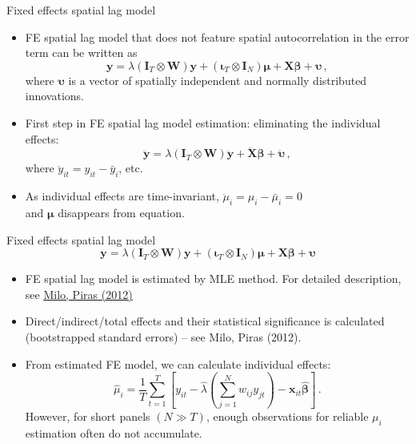 \documentclass{beamer}
\newcommand{\Ms}[2]{\bm{#1}_{#2}}
\begin{document}
\begin{frame}{Fixed effects spatial lag model}
\begin{itemize}
    \item FE spatial lag model that does not feature spatial autocorrelation in the error term can be written as 
\begin{equation*}
  \bm{y}  = 
  \lambda \left( \Ms{I}{T} \otimes \bm{W} \right) \bm{y} + 
  \left( \Ms{\iota}{T} \otimes \Ms{I}{N} \right) \bm{\mu} + 
  \bm{X \beta} + \bm{\upsilon} \,,
\end{equation*}
where $\bm{\upsilon}$ is a vector of spatially independent and normally distributed innovations.
\medskip
\item First step in FE spatial lag model estimation: eliminating the individual effects: 
\begin{equation*}
  \ddot{\bm{y}}  = 
  \lambda \left( \Ms{I}{T} \otimes \bm{W} \right) \ddot{\bm{y}} + 
  \ddot{\bm{X}} \bm{\beta} + \ddot{\bm{\upsilon}} \,,
\end{equation*}
where $\ddot{y}_{it}=y_{it}-\bar{y}_i$, etc.
\medskip
\item As individual effects are time-invariant, $\ddot{\mu}_{i}=\mu_{i}-\bar{\mu}_i=0$ \\and $\bm{\mu}$ disappears from equation.
\end{itemize}
\end{frame}
\begin{frame}{Fixed effects spatial lag model}
$$
\bm{y}  = 
  \lambda \left( \Ms{I}{T} \otimes \bm{W} \right) \bm{y} + 
  \left( \Ms{\iota}{T} \otimes \Ms{I}{N} \right) \bm{\mu} + 
  \bm{X \beta} + \bm{\upsilon}
$$
\begin{itemize}
    \item FE spatial lag model is estimated by MLE method. For detailed description, see \textcolor{blue}{\underline{\href{https://www.jstatsoft.org/article/view/v047i01}{Milo, Piras (2012)}}}
    \medskip
    \item Direct/indirect/total effects and their statistical significance is calculated (bootstrapped standard errors) -- see Milo, Piras (2012).
    \medskip
    \item From estimated FE model, we can calculate individual effects:
\begin{equation*}
\hat{\mu}_i =
\frac{1}{T} \sum_{t=1}^T \left[ y_{it} - \hat{\lambda} \left( \sum_{j=1}^N \! w_{ij} y_{jt} \right)
- \bm{x}_{it} \bm{\hat{\beta}} \right] \,.
\end{equation*}
However, for short panels $(N \gg T)$, enough observations for reliable $\mu_i$ estimation often do not accumulate.
\end{itemize}
\end{frame}
\end{document}
